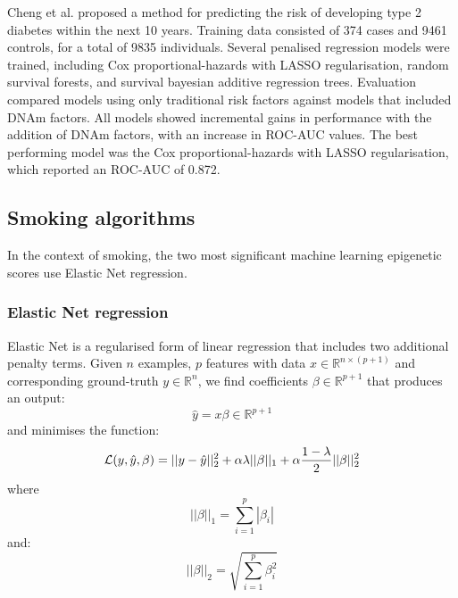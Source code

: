 \documentclass{article} %
\newcommand{\equationname}[1]{%
    \begingroup
        \leavevmode
        \addcontentsline{equ}{equations}{\protect\numberline{\theequation}#1}%
    \endgroup   
}
\begin{document}
Cheng et al. \cite{cheng2023development} proposed a method for predicting the risk of developing type 2 diabetes within the next 10 years. Training data consisted of 374 cases and \num{9461} controls, for a total of \num{9835} individuals. Several penalised regression models were trained, including Cox proportional-hazards with LASSO regularisation, random survival forests, and survival bayesian additive regression trees. Evaluation compared models using only traditional risk factors against models that included DNAm factors. All models showed incremental gains in performance with the addition of DNAm factors, with an increase in ROC-AUC values. The best performing model was the Cox proportional-hazards with LASSO regularisation, which reported an ROC-AUC of 0.872.

\subsection{Smoking algorithms}
In the context of smoking, the two most significant machine learning epigenetic scores use Elastic Net regression.

\subsubsection{Elastic Net regression} \label{sec:lin-elastic-net}
Elastic Net \cite{zou2005regularization} is a regularised form of linear regression that includes two additional penalty terms.
Given \(n\) examples, \(p\) features with data \(x \in \mathbb{R}^{n \times (p + 1)}\) and corresponding ground-truth \(y \in \mathbb{R}^n\), we find coefficients \(\beta \in \mathbb{R}^{p + 1}\) that produces an output:
\[\hat{y} = x \beta \in \mathbb{R}^{p + 1}\]
and minimises the function:
\begin{equation} \equationname{Elastic Net linear regression} \label{eqn:lin_elastic_net}
    \mathcal{L}(y, \hat{y}, \beta) = ||y - \hat{y}||_2^2 + \alpha\lambda||\beta||_1 + \alpha\frac{1 - \lambda}{2}||\beta||_2^2
\end{equation}
where
\[||\beta||_1 = \sum_{i=1}^{p} |\beta_i|\]
and:
\[||\beta||_2 = \sqrt{\sum_{i=1}^{p} \beta_i^2}\]
\end{document}

